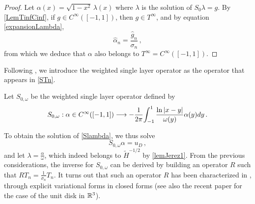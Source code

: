 \documentclass[a4paper]{article}
\begin{document}
\begin{proof}
	Let $\alpha (x)= \sqrt{1 - x^2}\,\lambda(x)$ where $\lambda$ is the solution of $S_0\lambda = g$.  
	By \autoref{LemTinfCinf}, if $g \in C^{\infty}([-1,1])$, then $g \in T^{\infty}$, and by equation 
	\eqref{expansionLambda}, 
	\[ \hat{\alpha}_n = \frac{\hat{g}_n}{\sigma_n}\,,\]
		from which we deduce that $\alpha$ also  belongs to $T^{\infty} = C^{\infty}([-1,1])$. 
\end{proof}

\noindent Following \cite{bruno2012second}, we introduce the weighted single layer operator as the operator 
that appears in \autoref{STn}.
\begin{Def}
	Let $S_{0,\omega}$ be the weighted single layer operator defined by
	\[S_{0,\omega} : \alpha \in C^{\infty}([-1,1]) \longrightarrow -\dfrac{1}{2\pi}{\int_{-1}^1\dfrac{\ln|x-y|}{\omega(y)} \alpha(y)dy}\,.\]
\end{Def}
\noindent To obtain the solution of \eqref{Slambda}, we thus solve 
\begin{equation}
	S_{0,\omega} \alpha = u_D\,,
	\label{Somegaalpha}
\end{equation}
and let $\lambda = \frac{\alpha}{\omega}$, which indeed belongs to $\tilde{H}^{-1/2}$ by \eqref{lemJerez1}. From the previous 
considerations, the inverse for $S_{0,\omega}$ can be derived by building an operator $R$ such that $RT_n = \frac{1}{\sigma_n}T_n$. 
It turns out that such an operator $R$ has been characterized in \cite{jerez2012explicit,urzua2014optimal}, through explicit 
variational forms in closed forms (see also the recent paper \cite{hiptmair2017closed}  
for the case of the unit disk in $\mathbb{R}^3$). 
\end{document}
